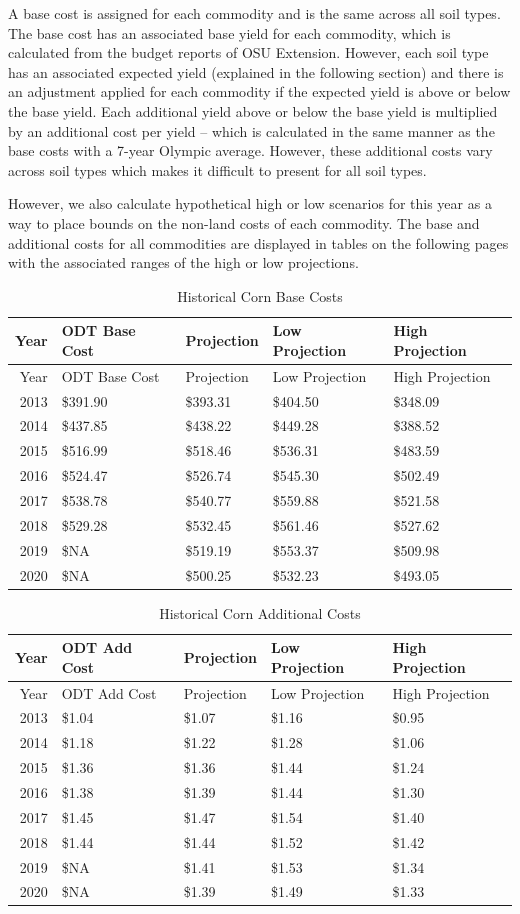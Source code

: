 \documentclass[]{article}
\begin{document}
A base cost is assigned for each commodity and is the same across all
soil types. The base cost has an associated base yield for each
commodity, which is calculated from the budget reports of OSU Extension.
However, each soil type has an associated expected yield (explained in
the following section) and there is an adjustment applied for each
commodity if the expected yield is above or below the base yield. Each
additional yield above or below the base yield is multiplied by an
additional cost per yield -- which is calculated in the same manner as
the base costs with a 7-year Olympic average. However, these additional
costs vary across soil types which makes it difficult to present for all
soil types.

However, we also calculate hypothetical high or low scenarios for this
year as a way to place bounds on the non-land costs of each commodity.
The base and additional costs for all commodities are displayed in
tables on the following pages with the associated ranges of the high or
low projections.

\newpage

\begin{longtable}[]{@{}rllll@{}}
\caption{Historical Corn Base Costs}\tabularnewline
\toprule
Year & ODT Base Cost & Projection & Low Projection & High
Projection\tabularnewline
\midrule
\endfirsthead
\toprule
Year & ODT Base Cost & Projection & Low Projection & High
Projection\tabularnewline
\midrule
\endhead
2013 & \$391.90 & \$393.31 & \$404.50 & \$348.09\tabularnewline
2014 & \$437.85 & \$438.22 & \$449.28 & \$388.52\tabularnewline
2015 & \$516.99 & \$518.46 & \$536.31 & \$483.59\tabularnewline
2016 & \$524.47 & \$526.74 & \$545.30 & \$502.49\tabularnewline
2017 & \$538.78 & \$540.77 & \$559.88 & \$521.58\tabularnewline
2018 & \$529.28 & \$532.45 & \$561.46 & \$527.62\tabularnewline
2019 & \$NA & \$519.19 & \$553.37 & \$509.98\tabularnewline
2020 & \$NA & \$500.25 & \$532.23 & \$493.05\tabularnewline
\bottomrule
\end{longtable}

\begin{longtable}[]{@{}rllll@{}}
\caption{Historical Corn Additional Costs}\tabularnewline
\toprule
Year & ODT Add Cost & Projection & Low Projection & High
Projection\tabularnewline
\midrule
\endfirsthead
\toprule
Year & ODT Add Cost & Projection & Low Projection & High
Projection\tabularnewline
\midrule
\endhead
2013 & \$1.04 & \$1.07 & \$1.16 & \$0.95\tabularnewline
2014 & \$1.18 & \$1.22 & \$1.28 & \$1.06\tabularnewline
2015 & \$1.36 & \$1.36 & \$1.44 & \$1.24\tabularnewline
2016 & \$1.38 & \$1.39 & \$1.44 & \$1.30\tabularnewline
2017 & \$1.45 & \$1.47 & \$1.54 & \$1.40\tabularnewline
2018 & \$1.44 & \$1.44 & \$1.52 & \$1.42\tabularnewline
2019 & \$NA & \$1.41 & \$1.53 & \$1.34\tabularnewline
2020 & \$NA & \$1.39 & \$1.49 & \$1.33\tabularnewline
\bottomrule
\end{longtable}
\end{document}
